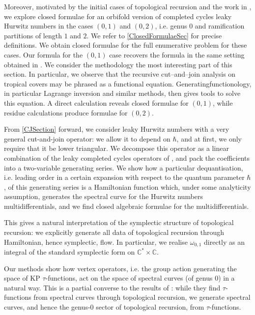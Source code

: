 \documentclass[10pt,a4paper,oneside,no-math,reqno]{amsart}%
\theoremstyle{plain}
\theoremstyle{definition}
\theoremstyle{remark}
\numberwithin{equation}{section}
\newcommand{\mb}[1]{\mathbb{#1}}
\newcommand{\1}{\mathds{1}}
\newcommand{\C}{\mb{C}}
\newcommand{\<}{\langle}
\renewcommand{\>}{\rangle}
\begin{document}
Moreover, motivated by the initial cases of topological recursion and the work in \cite{CMS25}, we explore closed formulae for an orbifold version of completed cycles leaky Hurwitz numbers in the cases $(0,1)$ and $(0,2)$, i.e. genus $0$ and ramification partitions of length $1$ and $2$. We refer to \cref{ClosedFormulaeSec} for precise definitions. We obtain closed formulae for the full enumerative problem for these cases. Our formula for the $(0,1)$ case recovers the formula in the same setting obtained in \cite{CMS25}. We consider the methodology the most interesting part of this section. In particular, we observe that the recursive cut--and--join analysis on tropical covers may be phrased as a functional equation. Generatingfunctionology, in particular Lagrange inversion and similar methods, then gives tools to solve this equation. A direct calculation reveals closed formulae for $(0,1)$, while residue calculations produce formulae for $(0,2)$.


From \cref{CJSection} forward, we consider leaky Hurwitz numbers with a very general cut-and-join operator: we allow it to depend on $ \hbar$, and at first, we only require that it be lower triangular. We decompose this operator as a linear combination of the leaky completed cycles operators of \cite{AKL25}, and pack the coefficients into a two-variable generating series. We show how a particular dequantisation, i.e. leading order in a certain expansion with respect to the quantum parameter $\hbar$, of this generating series is a Hamiltonian function which, under some analyticity assumption, generates the spectral curve for the Hurwitz numbers multidifferentials, and we find closed algebraic formulae for the multidifferentials.

This gives a natural interpretation of the symplectic structure of topological recursion: we explicitly generate all data of topological recursion through Hamiltonian, hence symplectic, flow. In particular, we realise $ \omega_{0,1}$ directly as an integral of the standard symplectic form on $ \C^* \times \C$.

Our methods show how vertex operators, i.e. the group action generating the space of KP $ \tau $-functions, act on the space of spectral curves (of genus $0$) in a natural way. This is a partial converse to the results of \cite{ABDKS24KP0}: while they find $\tau$-functions from spectral curves through topological recursion, we generate spectral curves, and hence the genus-$0$ sector of topological recursion, from $\tau$-functions.
\end{document}
